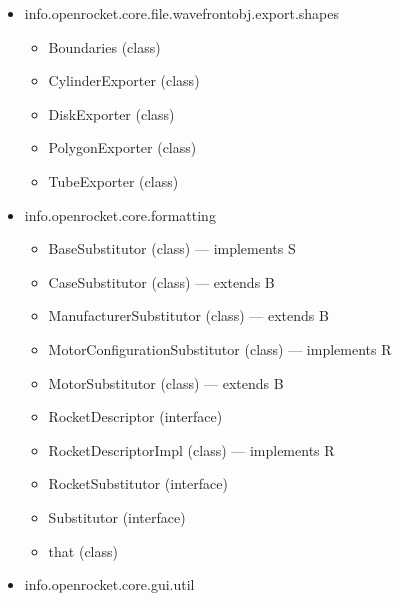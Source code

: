 \documentclass{amsdtx}
\begin{document}
\begin{itemize}
\begin{itemize}
\begin{itemize}
    \item
      BodyTubeExporter (class) --- extends R
    \item
      FinSetExporter (class) --- extends R
    \item
      LaunchLugExporter (class) --- extends R
    \item
      MassObjectExporter (class) --- extends R
    \item
      MotorExporter (class)
    \item
      RailButtonExporter (class) --- extends R
    \item
      RingComponentExporter (class) --- extends R
    \item
      RocketComponentExporter (class)
    \item
      TransitionExporter (class) --- extends R
    \item
      TubeFinSetExporter (class) --- extends R
    \item
      for (class)
    \item
      generates (class)
    \end{itemize}
  \item
    info.openrocket.core.file.wavefrontobj.export.shapes

    \begin{itemize}
    
    \item
      Boundaries (class)
    \item
      CylinderExporter (class)
    \item
      DiskExporter (class)
    \item
      PolygonExporter (class)
    \item
      TubeExporter (class)
    \end{itemize}
  \item
    info.openrocket.core.formatting

    \begin{itemize}
    
    \item
      BaseSubstitutor (class) --- implements S
    \item
      CaseSubstitutor (class) --- extends B
    \item
      ManufacturerSubstitutor (class) --- extends B
    \item
      MotorConfigurationSubstitutor (class) --- implements R
    \item
      MotorSubstitutor (class) --- extends B
    \item
      RocketDescriptor (interface)
    \item
      RocketDescriptorImpl (class) --- implements R
    \item
      RocketSubstitutor (interface)
    \item
      Substitutor (interface)
    \item
      that (class)
    \end{itemize}
  \item
    info.openrocket.core.gui.util


\end{itemize}
\end{itemize}
\end{document}
